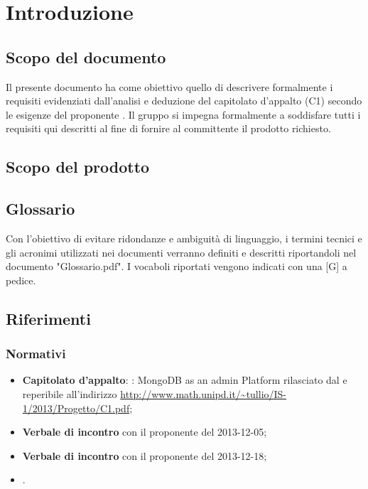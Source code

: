 \section{Introduzione}


\subsection{Scopo del documento}
Il presente documento ha come obiettivo quello di descrivere formalmente i requisiti evidenziati dall'analisi e deduzione del capitolato d'appalto \ProjectName{} (C1) secondo le esigenze del proponente \Proponente{}. Il gruppo \GroupName{} si impegna formalmente a soddisfare tutti i requisiti qui descritti al fine di fornire al committente il prodotto richiesto.

\subsection{Scopo del prodotto} 
\ScopoDelProdotto

\subsection{Glossario}
Con l'obiettivo di evitare ridondanze e ambiguità di linguaggio, i termini tecnici e gli acronimi utilizzati nei documenti verranno definiti e descritti riportandoli nel documento "Glossario.pdf". I vocaboli riportati vengono indicati con una [G] a pedice.

\subsection{Riferimenti}
	\subsubsection{Normativi}
	\begin{itemize}
	\item \textbf{Capitolato d'appalto}: \ProjectName{}: MongoDB as an admin Platform rilasciato dal  \Proponente{} e reperibile all'indirizzo \url{http://www.math.unipd.it/~tullio/IS-1/2013/Progetto/C1.pdf};
	\item \textbf{Verbale di incontro} con il proponente \Proponente{} del 2013-12-05;
	\item \textbf{Verbale di incontro} con il proponente \Proponente{} del 2013-12-18;
	\item \textbf{\NormeDiProgetto{}}. 
	\end{itemize}
	
